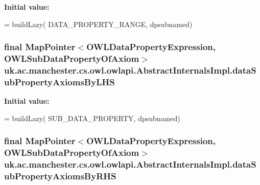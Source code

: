 {\bfseries Initial value\-:}
\begin{DoxyCode}
= buildLazy(
            DATA\_PROPERTY\_RANGE, dpsubnamed)
\end{DoxyCode}
\hypertarget{classuk_1_1ac_1_1manchester_1_1cs_1_1owl_1_1owlapi_1_1_abstract_internals_impl_a42549876210d85812004b2c82f5daffc}{
\subsubsection[{data\-Sub\-Property\-Axioms\-By\-L\-H\-S}]{\setlength{\rightskip}{0pt plus 5cm}final Map\-Pointer$<${\bf O\-W\-L\-Data\-Property\-Expression}, {\bf O\-W\-L\-Sub\-Data\-Property\-Of\-Axiom}$>$ uk.\-ac.\-manchester.\-cs.\-owl.\-owlapi.\-Abstract\-Internals\-Impl.\-data\-Sub\-Property\-Axioms\-By\-L\-H\-S\hspace{0.3cm}{\ttfamily [protected]}}}\label{classuk_1_1ac_1_1manchester_1_1cs_1_1owl_1_1owlapi_1_1_abstract_internals_impl_a42549876210d85812004b2c82f5daffc}
{\bfseries Initial value\-:}
\begin{DoxyCode}
= buildLazy(
            SUB\_DATA\_PROPERTY, dpsubnamed)
\end{DoxyCode}
\hypertarget{classuk_1_1ac_1_1manchester_1_1cs_1_1owl_1_1owlapi_1_1_abstract_internals_impl_a1db207df97563200224fb431b2f6b70c}{
\subsubsection[{data\-Sub\-Property\-Axioms\-By\-R\-H\-S}]{\setlength{\rightskip}{0pt plus 5cm}final Map\-Pointer$<${\bf O\-W\-L\-Data\-Property\-Expression}, {\bf O\-W\-L\-Sub\-Data\-Property\-Of\-Axiom}$>$ uk.\-ac.\-manchester.\-cs.\-owl.\-owlapi.\-Abstract\-Internals\-Impl.\-data\-Sub\-Property\-Axioms\-By\-R\-H\-S\hspace{0.3cm}{\ttfamily [protected]}}}\label{classuk_1_1ac_1_1manchester_1_1cs_1_1owl_1_1owlapi_1_1_abstract_internals_impl_a1db207df97563200224fb431b2f6b70c}
